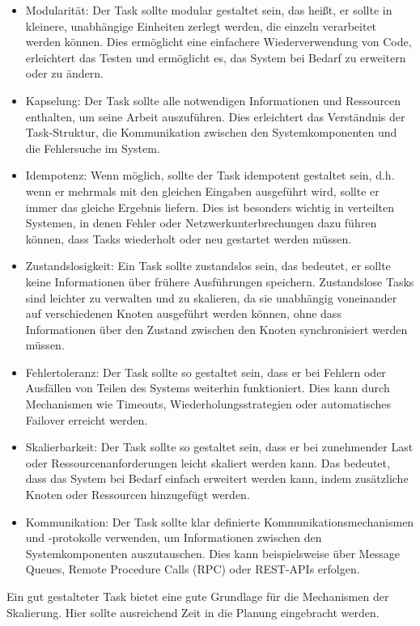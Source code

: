 \begin{itemize}
\item Modularität: Der Task sollte modular gestaltet sein, das heißt, er sollte in kleinere, unabhängige Einheiten zerlegt werden, die einzeln verarbeitet werden können. Dies ermöglicht eine einfachere Wiederverwendung von Code, erleichtert das Testen und ermöglicht es, das System bei Bedarf zu erweitern oder zu ändern.
\item Kapselung: Der Task sollte alle notwendigen Informationen und Ressourcen enthalten, um seine Arbeit auszuführen. Dies erleichtert das Verständnis der Task-Struktur, die Kommunikation zwischen den Systemkomponenten und die Fehlersuche im System.
\item Idempotenz: Wenn möglich, sollte der Task idempotent gestaltet sein, d.h. wenn er mehrmals mit den gleichen Eingaben ausgeführt wird, sollte er immer das gleiche Ergebnis liefern. Dies ist besonders wichtig in verteilten Systemen, in denen Fehler oder Netzwerkunterbrechungen dazu führen können, dass Tasks wiederholt oder neu gestartet werden müssen.
\item Zustandslosigkeit: Ein Task sollte zustandslos sein, das bedeutet, er sollte keine Informationen über frühere Ausführungen speichern. Zustandslose Tasks sind leichter zu verwalten und zu skalieren, da sie unabhängig voneinander auf verschiedenen Knoten ausgeführt werden können, ohne dass Informationen über den Zustand zwischen den Knoten synchronisiert werden müssen.
\item Fehlertoleranz: Der Task sollte so gestaltet sein, dass er bei Fehlern oder Ausfällen von Teilen des Systems weiterhin funktioniert. Dies kann durch Mechanismen wie Timeouts, Wiederholungsstrategien oder automatisches Failover erreicht werden.
\item Skalierbarkeit: Der Task sollte so gestaltet sein, dass er bei zunehmender Last oder Ressourcenanforderungen leicht skaliert werden kann. Das bedeutet, dass das System bei Bedarf einfach erweitert werden kann, indem zusätzliche Knoten oder Ressourcen hinzugefügt werden.
\item Kommunikation: Der Task sollte klar definierte Kommunikationsmechanismen und -protokolle verwenden, um Informationen zwischen den Systemkomponenten auszutauschen. Dies kann beispielsweise über Message Queues, Remote Procedure Calls (RPC) oder REST-APIs erfolgen.
\end{itemize}
Ein gut gestalteter Task bietet eine gute Grundlage für die Mechanismen der Skalierung. Hier sollte ausreichend Zeit in die Planung eingebracht werden.

